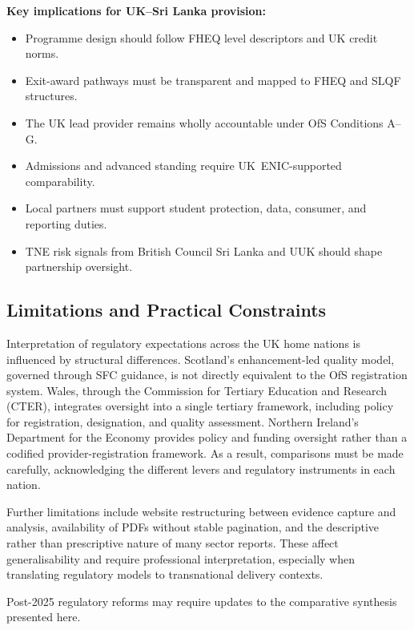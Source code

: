 \begin{tcolorbox}
\textbf{Key implications for UK--Sri Lanka provision:}
\begin{itemize}
    \item Programme design should follow FHEQ level descriptors and UK credit norms.
    \item Exit-award pathways must be transparent and mapped to FHEQ and SLQF structures.
    \item The UK lead provider remains wholly accountable under OfS Conditions A--G.
    \item Admissions and advanced standing require UK~ENIC-supported comparability.
    \item Local partners must support student protection, data, consumer, and reporting duties.
    \item TNE risk signals from British Council Sri Lanka and UUK should shape partnership oversight.
\end{itemize}
\end{tcolorbox}

\subsection{Limitations and Practical Constraints}

Interpretation of regulatory expectations across the UK home nations is influenced by 
structural differences. Scotland’s enhancement-led quality model, governed through SFC 
guidance, is not directly equivalent to the OfS registration system. Wales, through the 
Commission for Tertiary Education and Research (CTER), integrates oversight into a single 
tertiary framework, including policy for registration, designation, and quality assessment. 
Northern Ireland’s Department for the Economy provides policy and funding oversight rather than 
a codified provider-registration framework. As a result, comparisons must be made carefully, 
acknowledging the different levers and regulatory instruments in each nation.

Further limitations include website restructuring between evidence capture and analysis, 
availability of PDFs without stable pagination, and the descriptive rather than prescriptive 
nature of many sector reports. These affect generalisability and require professional 
interpretation, especially when translating regulatory models to transnational delivery 
contexts.

Post-2025 regulatory reforms may require updates to the comparative synthesis presented here.

